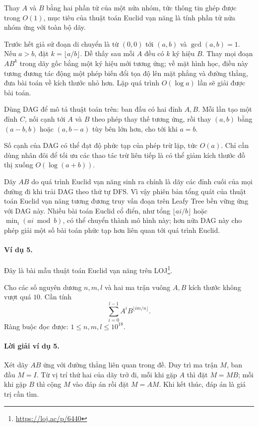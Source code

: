 \documentclass[11pt]{article}
\begin{document}
Thay $A$ và $B$ bằng hai phần tử của một nửa nhóm, tức thông tin ghép được trong
$O(1)$, mục tiêu của thuật toán Euclid vạn năng là tính phần tử nửa nhóm ứng với
toàn bộ dãy.

Trước hết giả sử đoạn di chuyển là từ $(0,0)$ tới $(a,b)$ và $\gcd(a,b)=1$. Nếu
$a>b$, đặt $k=\lfloor a/b\rfloor$. Dễ thấy sau mỗi $A$ đều có $k$ ký hiệu $B$.
Thay mọi đoạn $AB^k$ trong dãy gốc bằng một ký hiệu mới tương ứng; về mặt hình
học, điều này tương đương tác động một phép biến đổi tọa độ lên mặt phẳng và
đường thẳng, đưa bài toán về kích thước nhỏ hơn. Lặp quá trình $O(\log a)$ lần
sẽ giải được bài toán.

Dùng DAG để mô tả thuật toán trên: ban đầu có hai đỉnh $A,B$. Mỗi lần tạo một
đỉnh $C$, nối cạnh tới $A$ và $B$ theo phép thay thế tương ứng, rồi thay
$(a,b)$ bằng $(a-b,b)$ hoặc $(a,b-a)$ tùy bên lớn hơn, cho tới khi $a=b$.

Số cạnh của DAG có thể đạt độ phức tạp của phép trừ lặp, tức $O(a)$. Chỉ cần
dùng nhân đôi để tối ưu các thao tác trừ liên tiếp là có thể giảm kích thước đồ
thị xuống $O(\log(a+b))$.

Dãy $AB$ do quá trình Euclid vạn năng sinh ra chính là dãy các đỉnh cuối của
mọi đường đi khi trải DAG theo thứ tự DFS. Vì vậy phiên bản tổng quát của thuật
toán Euclid vạn năng tương đương truy vấn đoạn trên Leafy Tree bền vững ứng với
DAG này. Nhiều bài toán Euclid cổ điển, như tổng $\lfloor ai/b\rfloor$ hoặc
$\min_i(ai\bmod b)$, có thể chuyển thành mô hình này; hơn nữa DAG này cho phép
giải một số bài toán phức tạp hơn liên quan tới quá trình Euclid.

\paragraph{Ví dụ 5.}
Đây là bài mẫu thuật toán Euclid vạn năng trên LOJ\footnote{\url{https://loj.ac/p/6440}}.

Cho các số nguyên dương \(n,m,l\) và hai ma trận vuông \(A,B\) kích thước không
vượt quá \(10\). Cần tính
\[
  \sum_{i=0}^{l-1} A^i B^{\lfloor im/n\rfloor}.
\]
Ràng buộc đọc được: \(1\le n,m,l\le 10^{18}\).

\paragraph{Lời giải ví dụ 5.}
Xét dãy $AB$ ứng với đường thẳng liên quan trong đề. Duy trì ma trận $M$, ban đầu
$M=I$. Từ vị trí thứ hai của dãy trở đi, mỗi khi gặp $A$ thì đặt $M=MB$; mỗi khi
gặp $B$ thì cộng $M$ vào đáp án rồi đặt $M=AM$. Khi kết thúc, đáp án là giá trị
cần tìm.
\end{document}
